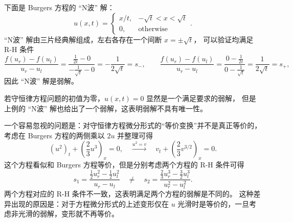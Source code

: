 \begin{example}
    下面是 Burgers 方程的 “N波” 解：
    \[
        u(x,t) =
        \begin{cases}
            x/t, & -\sqrt{t} < x < \sqrt{t} \\
            0,   & \text{otherwise}
        \end{cases}.
    \]
    “N波” 解由三片经典解组成，左右各存在一个间断 $x = \pm \sqrt{t}$，
    可以验证均满足 R-H 条件
    \[
        \frac{f(u_r) - f(u_l)}{u_r - u_l} =
        \frac{\frac{1}{2t} - 0}{- \frac{1}{\sqrt{t}} - 0} = -\frac{1}{2\sqrt{t}} = s_-,
        \qquad
        \frac{f(u_r) - f(u_l)}{u_r - u_l} =
        \frac{0 - \frac{1}{2t}}{0 - \frac{1}{\sqrt{t}}} = \frac{1}{2\sqrt{t}} = s_+,
    \]
    因此 “N波” 解是弱解。
\end{example}

\begin{remark}
    若守恒律方程问题的初值为零，$u(x,t) = 0$ 显然是一个满足要求的弱解，
    但是上例的 “N波” 解也给出了一个弱解，这表明弱解不具有唯一性。
\end{remark}

一个容易忽视的问题是：对守恒律方程微分形式的“等价变换”并不是真正等价的，考虑在 Burgers 方程的两侧乘以 $2u$ 并整理可得
\[
    (u^2)_t + \left(\frac{2}3 u^3\right)_x = 0, \quad
    \xrightarrow{u^2 = v} \quad
    v_t + \left(\frac{2}3 v^{3/2}\right)_x = 0.
\]
这个方程看似和 Burgers 方程等价，但是分别考虑两个方程的 R-H 条件可得
\[
    s_1 = \frac{\frac12 u_r^2 - \frac12 u_l^2}{u_r - u_l}
    \quad \neq \quad
    s_2 = \frac{\frac23 u_r^3 - \frac32 u_l^3}{u_r^2 - u_l^2}.
\]
两个方程对应的 R-H 条件不一致，这表明满足两个方程的弱解是不同的。
这种差异出现的原因是：对于方程微分形式的上述变形仅在 $u$ 光滑时是等价的，一旦考虑非光滑的弱解，变形就不再等价。


